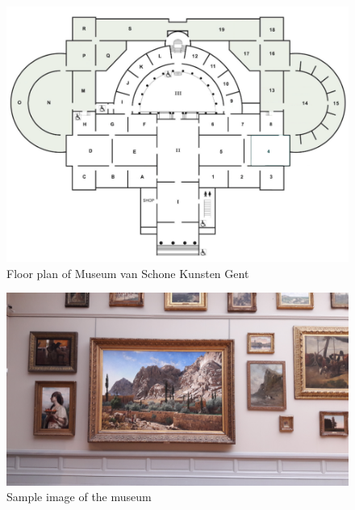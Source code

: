 \begin{figure}[htbp]
    \includegraphics[width=\linewidth]{images/groundplan_msk.PNG}
    \caption{Floor plan of Museum van Schone Kunsten Gent}
    \label{fig:msk-groundplan}
\end{figure}

\begin{figure}[htbp]
    \includegraphics[width=\linewidth]{images/image-example.png}
    \caption{Sample image of the museum}
    \label{fig:image-example}
\end{figure}